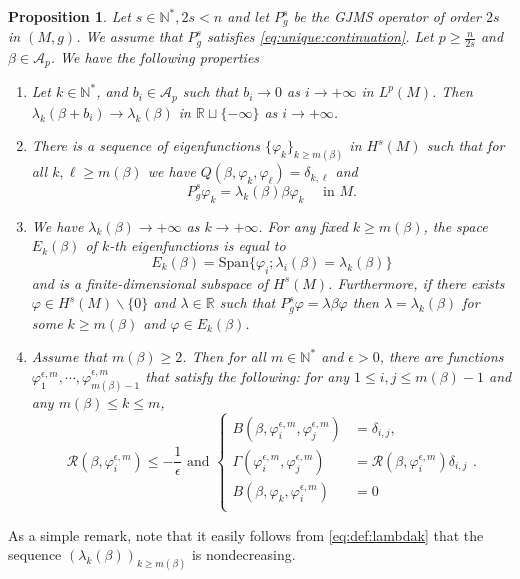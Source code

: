 \documentclass[10pt]{amsart}
\numberwithin{equation}{section}
\newcommand{\R}{\mathbb{R}}
\newcommand{\N}{\mathbb{N}}
\newcommand{\vp}{\varphi}
\theoremstyle{plain}
\newtheorem{prop}[theo]{Proposition}%
\theoremstyle{remark}
\begin{document}
\begin{prop} \label{prop:deficontinuityeigen} 
Let $s \in \mathbb{N}^*, 2s <n$ and let $P_g^s$ be the GJMS operator of order $2s$ in $(M,g)$. We assume that $P_g^s$ satisfies \eqref{eq:unique:continuation}. Let $p \ge \frac{n}{2s}$ and $\beta \in \mathcal{A}_p$. We have the following properties
\begin{enumerate}
\item Let $k \in \N^*$, and $b_i \in \mathcal{A}_p$ such that $b_i \to 0 $ as $i\to +\infty$ in $L^p(M)$. Then $\lambda_k(\beta+b_i)\to \lambda_k(\beta)$ in $\mathbb{R} \sqcup \{-\infty\}$ as $i\to +\infty$.
\item There is a sequence of eigenfunctions $\{\vp_k \}_{k\geq m(\beta)}$ in $H^s(M)$ such that for all $k, \ell \ge m(\beta)$ we have $Q(\beta,\vp_k,\vp_\ell) = \delta_{k,\ell}$ and
$$ P_g^s \vp_k = \lambda_k(\beta)\beta \vp_k \quad \text{ in } M. $$
\item We have $\lambda_k(\beta) \to +\infty$ as $k\to +\infty$. For any fixed $k \geq m(\beta)$, the space $E_k(\beta)$ of $k$-th eigenfunctions is equal to
$$ E_k(\beta) = \text{Span} \Big \{  \vp_i ; \lambda_i(\beta) = \lambda_k(\beta) \Big \} $$
and is a finite-dimensional subspace of $H^s(M)$. Furthermore, if there exists $\vp \in H^s(M) \backslash \{0\}$ and $\lambda \in \R$ such that $P_g^s \vp = \lambda \beta \vp$ then $\lambda = \lambda_k(\beta)$ for some $k \ge m(\beta)$ and $\vp \in E_k(\beta)$. 
\item Assume that $m(\beta)\geq 2$. Then for all $m\in \N^*$ and $\epsilon >0$, there are functions $\vp_1^{\epsilon,m},\cdots, \varphi_{m(\beta)-1}^{\epsilon,m}$ that satisfy
 the following: for any $ 1 \leq i,j \leq m(\beta)-1$ and any  $m(\beta) \leq k \leq m$,
$$
 \mathcal{R}(\beta,\vp_i^{\epsilon,m})  \leq -\frac{1}{\epsilon} \text{ and } \left \{
 \begin{aligned}
B(\beta,\vp_i^{\epsilon,m},\vp_j^{\epsilon,m}) & = \delta_{i,j}, \\
\Gamma(\vp_i^{\epsilon,m},\vp_j^{\epsilon,m}) & = \mathcal{R}(\beta,\vp_i^{\epsilon,m}) \delta_{i,j} \\
  B(\beta,\vp_k, \vp_i^{\epsilon,m}) & = 0 \\
 \end{aligned}\right. . $$
\end{enumerate}
\end{prop}
As a simple remark, note that it easily follows from  \eqref{eq:def:lambdak} that the sequence $(\lambda_k(\beta))_{k \ge m(\beta)}$ is nondecreasing. 
\end{document}
